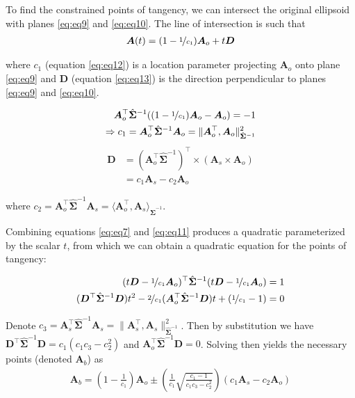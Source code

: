 \documentclass[preprint]{seismica}
\begin{document}
    To find the constrained points of tangency, we can intersect the original ellipsoid with planes
    \ref{eq:eq9} and \ref{eq:eq10}. The line of intersection is such that
    \begin{align} \label{eq:eq11}
      \bm{A}(t) = (1 - \nicefrac{1}{c_1}) \bm{A}_o + t\bm{D}
    \end{align}

    \noindent where $c_1$ (equation \ref{eq:eq12}) is a location parameter projecting $\bm{A}_o$ onto plane \ref{eq:eq9}
    and $\bm{D}$ (equation \ref{eq:eq13}) is the direction perpendicular to planes \ref{eq:eq9} and \ref{eq:eq10}. 

    \begin{align} \label{eq:eq12}
      \nonumber \bm{A}_o^\top \hat{\bm{\Sigma}}^{-1} ((1 - \nicefrac{1}{c_1})\bm{A}_o - \bm{A}_o)  = -1\\
      \Rightarrow c_1 = \bm{A}_o^\top \hat{\bm{\Sigma}}^{-1} \bm{A}_o = \|\bm{A}_o^\top, \bm{A}_o\|_{\hat{\bm{\Sigma}}^{-1}}^2
    \end{align}
    \begin{align} \label{eq:eq13}
      \nonumber\bm{D} &= (\bm{A}_o^\top \hat{\bm{\Sigma}}^{-1})^\top \times (\bm{A}_s \times \bm{A}_o)\\
        &= c_1\bm{A}_s - c_2\bm{A}_o
    \end{align}

    \noindent where $c_2 = \bm{A}_o^\top \hat{\bm{\Sigma}}^{-1} \bm{A}_s = \langle\bm{A}_o^\top, \bm{A}_s\rangle_{\hat{\bm{\Sigma}}^{-1}}$.

    Combining equations \ref{eq:eq7} and \ref{eq:eq11} produces a quadratic parameterized by the scalar $t$,
    from which we can obtain a quadratic equation for the points of tangency:

    \begin{align} \label{eq:eq14}
      \nonumber (t\bm{D} - \nicefrac{1}{c_1}\bm{A}_o)^\top \hat{\bm{\Sigma}}^{-1} (t\bm{D} - \nicefrac{1}{c_1}\bm{A}_o)  = 1\\
      \nonumber ({\bm{D}^\top \hat{\bm{\Sigma}}^{-1} \bm{D}})t^2 - \nicefrac{2}{c_1}(\bm{A}_o^\top \hat{\bm{\Sigma}}^{-1} \bm{D})t + (\nicefrac{1}{c_1} - 1) = 0\\
    \end{align}

    Denote $c_3 = \bm{A}_s^\top \hat{\bm{\Sigma}}^{-1} \bm{A}_s = \|\bm{A}_s^\top, \bm{A}_s\|_{\hat{\bm{\Sigma}}^{-1}}^2$. Then by
    substitution we have
    ${\bm{D}^\top \hat{\bm{\Sigma}}^{-1} \bm{D}} = c_1(c_1c_3 - c_2^2)$ and ${\bm{A}_o^\top \hat{\bm{\Sigma}}^{-1} \bm{D}} = 0$.
    Solving then yields the necessary points (denoted $\bm{A}_b$) as
    \begin{align} \label{eq:eq15}
      \bm{A}_b = \left(1 - \frac{1}{c_1}\right)\bm{A}_o \pm
        \left(\frac{1}{c_1} \sqrt{\frac{c_1 - 1}{c_1c_3 - c_2^2}}\right)(c_1\bm{A}_s - c_2\bm{A}_o)
    \end{align}
\end{document}
